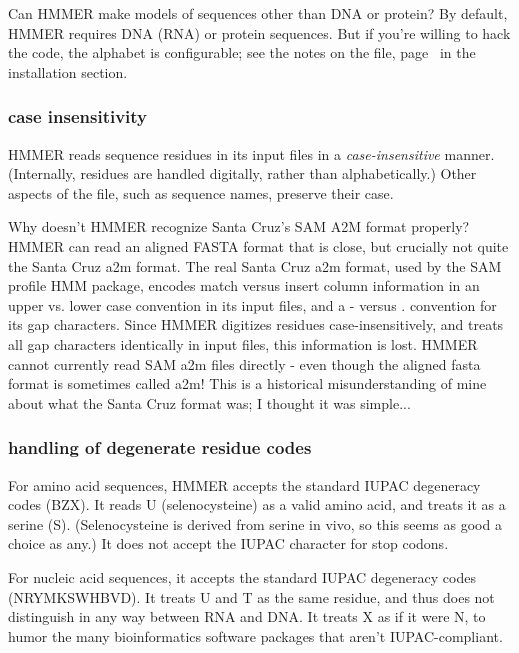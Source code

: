 \begin{srefaq}{Can HMMER make models of sequences other than DNA or
protein?} By default, HMMER requires DNA (RNA) or protein sequences.
But if you're willing to hack the code, the alphabet is configurable;
see the notes on the  file,
page~\pageref{section:alphabet-config} in the installation section.
\end{srefaq}

\subsubsection{case insensitivity}

HMMER reads sequence residues in its input files in a
\emph{case-insensitive} manner.  (Internally, residues are handled
digitally, rather than alphabetically.) Other aspects of the file,
such as sequence names, preserve their case.

\begin{srefaq}{Why doesn't HMMER recognize Santa Cruz's SAM A2M format
properly?} HMMER can read an aligned FASTA format that is close, but
crucially not quite the Santa Cruz a2m format.  The real Santa Cruz
a2m format, used by the SAM profile HMM package, encodes match versus
insert column information in an upper vs. lower case convention in its
input files, and a - versus . convention for its gap characters.
Since HMMER digitizes residues case-insensitively, and treats
all gap characters identically in input files, this
information is lost. HMMER cannot currently read SAM a2m files
directly - even though the aligned fasta format is sometimes
called a2m! This is a historical misunderstanding of mine
about what the Santa Cruz format was; I thought it was simple...
\end{srefaq}

\subsubsection{handling of degenerate residue codes}

For amino acid sequences, HMMER accepts the standard IUPAC degeneracy
codes (BZX). It reads U (selenocysteine) as a valid amino acid, and
treats it as a serine (S). (Selenocysteine is derived from serine in
vivo, so this seems as good a choice as any.) It does not accept the
IUPAC \prog{*} character for stop codons.

For nucleic acid sequences, it accepts the standard IUPAC degeneracy
codes (NRYMKSWHBVD). It treats U and T as the same residue, and thus
does not distinguish in any way between RNA and DNA.  It treats X as
if it were N, to humor the many bioinformatics software packages that
aren't IUPAC-compliant.

